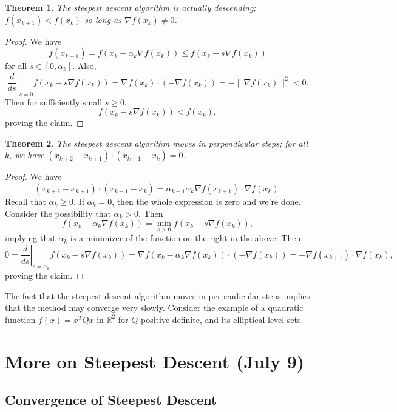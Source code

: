 \documentclass[11pt]{article}
\newcommand{\R}{\mathbb{R}}
\newtheorem{theorem}{Theorem}[subsection]
\begin{document}
\begin{theorem}
The steepest descent algorithm is actually descending; $f(x_{k+1}) < f(x_k)$ so long as $\nabla f(x_k) \neq 0$.
\end{theorem}
\begin{proof}
We have
\[
f(x_{k+1}) = f(x_k - \alpha_k \nabla f(x_k)) \leq f(x_k - s \nabla f(x_k))
\]
for all $s \in [0, \alpha_k]$. Also,
\[
\left. \frac{d}{ds} \right|_{s=0} f(x_k - s\nabla f(x_k)) = \nabla f(x_k) \cdot (-\nabla f(x_k)) = -\| \nabla f(x_k) \|^2 < 0.
\]
Then for sufficiently small $s \geq 0$,
\[
f(x_k - s\nabla f(x_k)) < f(x_k),
\]
proving the claim.
\end{proof}

\begin{theorem}
The steepest descent algorithm moves in perpendicular steps; for all $k$, we have $(x_{k+2} - x_{k+1})\cdot(x_{k+1} - x_k) = 0$.
\end{theorem}
\begin{proof}
We have
\[
(x_{k+2} - x_{k+1})\cdot(x_{k+1} - x_k) = \alpha_{k+1}\alpha_k \nabla f(x_{k+1}) \cdot \nabla f(x_k).
\]
Recall that $\alpha_k \geq 0$. If $\alpha_k = 0$, then the whole expression is zero and we're done. Consider the possibility that $\alpha_k > 0$. Then
\[
f(x_k - \alpha_k \nabla f(x_k)) = \min_{s > 0} f(x_k - s \nabla f(x_k)),
\]
implying that $\alpha_k$ is a minimizer of the function on the right in the above. Then
\[
0 = \left. \frac{d}{ds} \right|_{s=\alpha_k} f(x_k - s\nabla f(x_k)) = \nabla f(x_k - \alpha_k \nabla f(x_k)) \cdot (-\nabla f(x_k)) = -\nabla f(x_{k+1}) \cdot \nabla f(x_k),
\]
proving the claim.
\end{proof}

The fact that the steepest descent algorithm moves in perpendicular steps implies that the method may converge very slowly. Consider the example of a quadratic function $f(x) = x^TQx$ in $\R^2$ for $Q$ positive definite, and its elliptical level sets. 

\newpage

\section{More on Steepest Descent (July 9)}

\subsection{Convergence of Steepest Descent}
\end{document}
